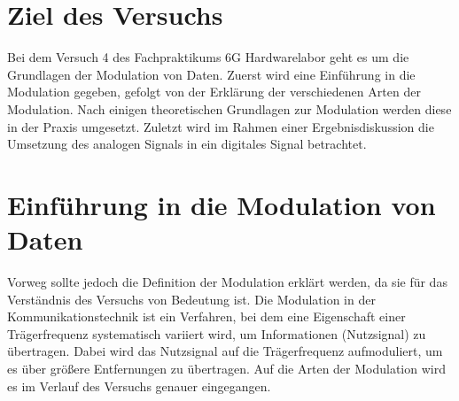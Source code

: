 
    \section{Ziel des Versuchs}
    Bei dem Versuch 4 des Fachpraktikums 6G Hardwarelabor geht es um die Grundlagen der Modulation von Daten. 
    Zuerst wird eine Einführung in die Modulation gegeben, gefolgt von der Erklärung der verschiedenen Arten der Modulation. Nach einigen theoretischen Grundlagen zur Modulation werden diese in der Praxis umgesetzt.
    Zuletzt wird im Rahmen einer Ergebnisdiskussion die Umsetzung des analogen Signals in ein digitales Signal betrachtet.
    \section{Einführung in die Modulation von Daten}
    Vorweg sollte jedoch die Definition der Modulation erklärt werden, da sie für das Verständnis des Versuchs von Bedeutung ist.
    Die Modulation in der Kommunikationstechnik ist ein Verfahren, bei dem eine Eigenschaft einer Trägerfrequenz systematisch variiert wird, um Informationen (Nutzsignal) zu übertragen.
    Dabei wird das Nutzsignal auf die Trägerfrequenz aufmoduliert, um es über größere Entfernungen zu übertragen.
    Auf die Arten der Modulation wird es im Verlauf des Versuchs genauer eingegangen.
\clearpage